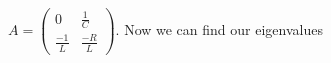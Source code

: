 \documentclass[preview]{standalone}
\begin{document}
\begin{center}
\raggedright
                    \(A = \begin{pmatrix}
                                0 & \frac{1}{C} \\
                                \frac{-1}{L} & \frac{-R}{L}
                            \end{pmatrix}\).
                    Now we can find our eigenvalues
\end{center}
\end{document}
